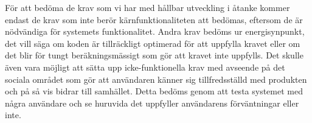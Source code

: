 För att bedöma de krav som vi har med hållbar utveckling i åtanke kommer endast de krav som inte berör kärnfunktionaliteten att bedömas, eftersom de är nödvändiga för systemets funktionalitet. Andra krav bedöms ur energisynpunkt, det vill säga om koden är tillräckligt optimerad för att uppfylla kravet eller om det blir för tungt beräkningsmässigt som gör att kravet inte uppfylls. Det skulle även vara möjligt att sätta upp icke-funktionella krav med avseende på det sociala området som gör att användaren känner sig tillfredsställd med produkten och på så vis bidrar till samhället. Detta bedöms genom att testa systemet med några användare och se huruvida det uppfyller användarens förväntningar eller inte.

